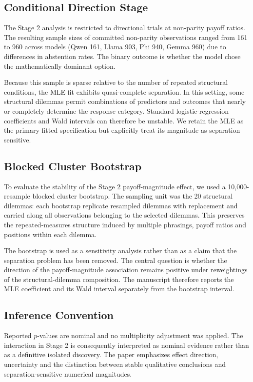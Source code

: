 \documentclass[10pt,journal,compsoc]{IEEEtran}
\begin{document}
\subsection{Conditional Direction Stage}
The Stage 2 analysis is restricted to directional trials at non-parity payoff ratios. The resulting sample sizes of committed non-parity observations ranged from 161 to 960 across models (Qwen 161, Llama 903, Phi 940, Gemma 960) due to differences in abstention rates. The binary outcome is whether the model chose the mathematically dominant option.

Because this sample is sparse relative to the number of repeated structural conditions, the MLE fit exhibits quasi-complete separation. In this setting, some structural dilemmas permit combinations of predictors and outcomes that nearly or completely determine the response category. Standard logistic-regression coefficients and Wald intervals can therefore be unstable. We retain the MLE as the primary fitted specification but explicitly treat its magnitude as separation-sensitive.

\subsection{Blocked Cluster Bootstrap}
To evaluate the stability of the Stage 2 payoff-magnitude effect, we used a 10,000-resample blocked cluster bootstrap. The sampling unit was the 20 structural dilemmas: each bootstrap replicate resampled dilemmas with replacement and carried along all observations belonging to the selected dilemmas. This preserves the repeated-measures structure induced by multiple phrasings, payoff ratios and positions within each dilemma.

The bootstrap is used as a sensitivity analysis rather than as a claim that the separation problem has been removed. The central question is whether the direction of the payoff-magnitude association remains positive under reweightings of the structural-dilemma composition. The manuscript therefore reports the MLE coefficient and its Wald interval separately from the bootstrap interval.

\subsection{Inference Convention}
Reported $p$-values are nominal and no multiplicity adjustment was applied. The interaction in Stage 2 is consequently interpreted as nominal evidence rather than as a definitive isolated discovery. The paper emphasizes effect direction, uncertainty and the distinction between stable qualitative conclusions and separation-sensitive numerical magnitudes.
\end{document}
